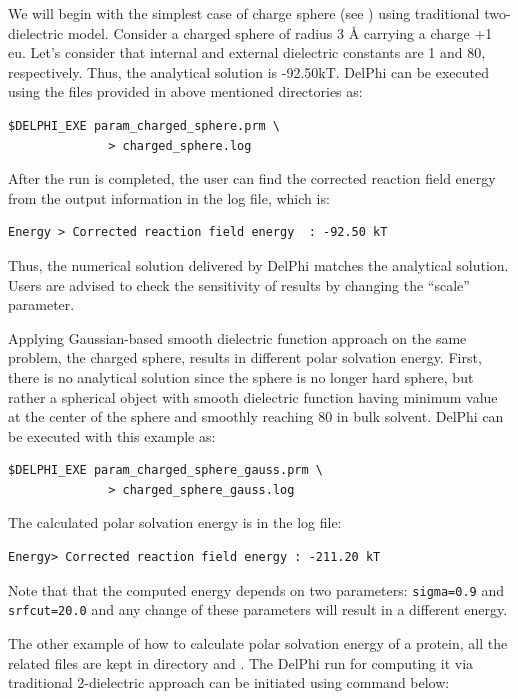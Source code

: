 \documentclass[9pt,tutorial]{livecoms}
\newcommand*\ttvar[1]{\texttt{\expandafter\dottvar\detokenize{#1}\relax}}
\newcommand*\dottvar[1]{\ifx\relax#1\else
  \expandafter\ifx\string_#1\string_\allowbreak\else#1\fi
  \expandafter\dottvar\fi}
\begin{document}
We will begin with the simplest case of charge sphere (see \ttvar{Example_3.1.1/Ex1}) using traditional two-dielectric model. Consider a charged sphere of radius 3 Å carrying a charge +1 eu. Let’s consider that internal and external dielectric constants are 1 and 80, respectively. Thus, the analytical solution is -92.50kT. DelPhi can be executed using the files provided in above mentioned directories as:

\begin{verbatim}
$DELPHI_EXE param_charged_sphere.prm \
              > charged_sphere.log
\end{verbatim}

After the run is completed, the user can find the corrected reaction field energy from the output information in the log file, which is: 
\begin{verbatim}
Energy > Corrected reaction field energy  : -92.50 kT
\end{verbatim}

Thus, the numerical solution delivered by DelPhi matches the analytical solution. Users are advised to check the sensitivity of results by changing the “scale” parameter. 

Applying Gaussian-based smooth dielectric function approach on the same problem, the charged sphere, results in different polar solvation energy. First, there is no analytical solution since the sphere is no longer hard sphere, but rather a spherical object with smooth dielectric function having minimum value at the center of the sphere and smoothly reaching 80 in bulk solvent. DelPhi can be executed with this example as:

\begin{verbatim}
$DELPHI_EXE param_charged_sphere_gauss.prm \
              > charged_sphere_gauss.log
\end{verbatim}

The calculated polar solvation energy is in the log file:

\begin{verbatim}
Energy> Corrected reaction field energy : -211.20 kT
\end{verbatim}

Note that that the computed energy depends on two parameters: \texttt{sigma=0.9} and \texttt{srfcut=20.0} and any change of these parameters will result in a different energy. 

The other example of how to calculate polar solvation energy of a protein, all the related files are kept in directory  and \ttvar{Example_3.1.1/Ex2/}. The DelPhi run for computing it via traditional 2-dielectric approach can be initiated using command below:
\end{document}
